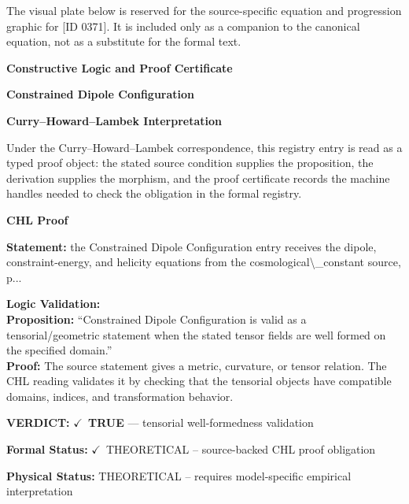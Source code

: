 \begingroup\footnotesize\sloppy
The visual plate below is reserved for the source-specific equation and progression graphic for [ID 0371]. It is included only as a companion to the canonical equation, not as a substitute for the formal text.
\par\endgroup
\ifTZPDarkEdition
{}
\fi

\clearpage
\begingroup\tzpsupportsetup
\noindent\textbf{\fontsize{10.8pt}{12.8pt}\selectfont [ID 0371] Constructive Logic and Proof Certificate}\par
\noindent\textbf{\fontsize{10pt}{12pt}\selectfont Constrained Dipole Configuration}\par
\vspace{0.45em}
\begingroup
\footnotesize
\setlength{\parskip}{0.22em}
\setlength{\parindent}{0pt}
\noindent\textbf{Curry--Howard--Lambek Interpretation}\par
Under the Curry--Howard--Lambek correspondence, this registry entry is read as a typed proof
object: the stated source condition supplies the proposition, the derivation supplies the
morphism, and the proof certificate records the machine handles needed to check the obligation
in the formal registry.

\vspace{0.45em}
\noindent\textbf{CHL Proof}\par
\textbf{Statement:} the Constrained Dipole Configuration entry receives the dipole, constraint-energy, and
helicity equations from the cosmological\textbackslash{}\_constant source, p...

\textbf{Logic Validation:}\\
\textbf{Proposition:} ``Constrained Dipole Configuration is valid as a tensorial/geometric statement when the
stated tensor fields are well formed on the specified domain.''\\
\textbf{Proof:} The source statement gives a metric, curvature, or tensor relation. The CHL reading
validates it by checking that the tensorial objects have compatible domains, indices,
and transformation behavior.

\textbf{VERDICT:} \ensuremath{\checkmark}\ \textbf{TRUE} --- tensorial well-formedness validation

\textbf{Formal Status:} \ensuremath{\checkmark}\ THEORETICAL -- source-backed CHL proof obligation

\textbf{Physical Status:} THEORETICAL -- requires model-specific empirical interpretation
\par\vspace{0.45em}
\par
\ifTZPDarkEdition
{}
\fi
\endgroup
\endgroup
